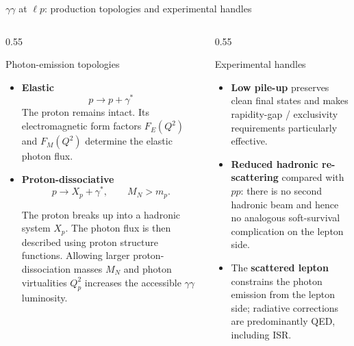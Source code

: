 \documentclass[aspectratio=1610,english]{beamer}
\begin{document}
\begin{frame}{$\gamma\gamma$ at $\ell p$: production topologies and experimental handles}

\begin{columns}%
	
\begin{column}{0.55\textwidth}

\begin{block}{Photon-emission topologies}

\begin{itemize}

\footnotesize \justifying
					
\item
\textcolor{LHGreen}{\textbf{Elastic}}
\[
p\rightarrow p+\gamma^{*}
\]
The proton remains intact. Its electromagnetic form factors
$F_E(Q^2)$ and $F_M(Q^2)$ determine the elastic photon flux.
					
\item
\textcolor{LHRed}{\textbf{Proton-dissociative}}
\[
p\rightarrow X_p+\gamma^{*},
\qquad M_N>m_p .
\]

The proton breaks up into a hadronic system $X_p$.
The photon flux is then described using proton structure functions.
Allowing larger proton-dissociation masses $M_N$ and photon virtualities
$Q_p^2$ increases the accessible $\gamma\gamma$ luminosity.					
\end{itemize}
				
\end{block}
			
\end{column}
		

\begin{column}{0.55\textwidth}
			
\begin{alertblock}{Experimental handles}

\begin{itemize}

\footnotesize \justifying
					
\item
\textbf{Low pile-up}
preserves clean final states and makes rapidity-gap /
exclusivity requirements particularly effective.
					
\item
\textbf{Reduced hadronic re-scattering}
compared with $pp$:
there is no second hadronic beam and hence no analogous
soft-survival complication on the lepton side.
					
\item
The \textbf{scattered lepton} constrains the photon emission
from the lepton side; radiative corrections are predominantly QED,
including ISR.
					

\end{itemize}
\end{alertblock}
\end{column}
\end{columns}
\end{frame}
\end{document}
